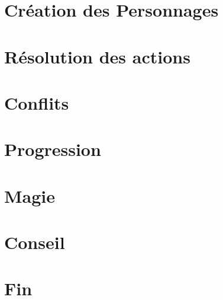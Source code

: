 \part{Création des Personnages}



\part{Résolution des actions}



\part{Conflits}



\part{Progression}



\part{Magie}



\part{Conseil}



\part*{Fin}
